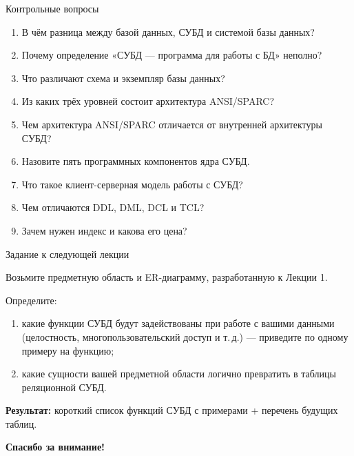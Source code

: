 \documentclass[aspectratio=169]{beamer}
\begin{document}
\begin{frame}{Контрольные вопросы}

\small
\begin{enumerate}
  \item В чём разница между базой данных, СУБД и системой базы данных?
  \item Почему определение «СУБД — программа для работы с БД» неполно?
  \item Что различают схема и экземпляр базы данных?
  \item Из каких трёх уровней состоит архитектура ANSI/SPARC?
  \item Чем архитектура ANSI/SPARC отличается от внутренней архитектуры СУБД?
  \item Назовите пять программных компонентов ядра СУБД.
  \item Что такое клиент-серверная модель работы с СУБД?
  \item Чем отличаются DDL, DML, DCL и TCL?
  \item Зачем нужен индекс и какова его цена?
\end{enumerate}

\end{frame}


\begin{frame}{Задание к следующей лекции}

Возьмите предметную область и ER-диаграмму,
разработанную к Лекции 1.

\vspace{0.4cm}

Определите:
\begin{enumerate}
  \item какие функции СУБД будут задействованы при работе
        с вашими данными (целостность, многопользовательский
        доступ и т.\,д.) — приведите по одному примеру
        на функцию;
  \item какие сущности вашей предметной области логично
        превратить в таблицы реляционной СУБД.
\end{enumerate}

\vspace{0.4cm}

\textbf{Результат:} короткий список функций СУБД
с примерами + перечень будущих таблиц.

\end{frame}


\begin{frame}

\thispagestyle{empty}

\vspace*{\fill}

\begin{center}

{\LARGE\bfseries
Спасибо за внимание!
}

\end{center}

\vspace*{\fill}

\end{frame}
\end{document}
